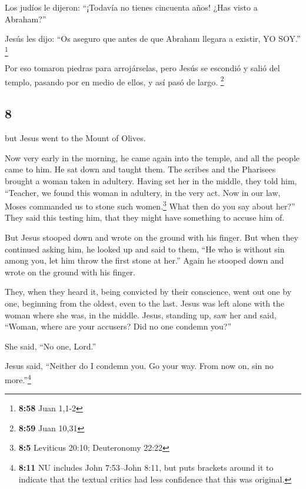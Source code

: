\begin{paracol}{2}
 Los judíos le dijeron: ``¡Todavía no tienes cincuenta
años! ¿Has visto a Abraham?''

 Jesús les dijo: ``Os aseguro que antes de que Abraham
llegara a existir, YO SOY.'' \footnote{\textbf{8:58} Juan 1,1-2}

 Por eso tomaron piedras para arrojárselas, pero Jesús se
escondió y salió del templo, pasando por en medio de ellos, y así pasó
de largo. \footnote{\textbf{8:59} Juan 10,31}

\switchcolumn
\begin{otherlanguage}{english}

\hypertarget{section-15}{%
\section{8}\label{section-15}}

 but Jesus went to the Mount of Olives.

 Now very early in the morning, he came again into the
temple, and all the people came to him. He sat down and taught them.
 The scribes and the Pharisees brought a woman taken in
adultery. Having set her in the middle,  they told him,
``Teacher, we found this woman in adultery, in the very act.
 Now in our law, Moses commanded us to stone such
women.\footnote{\textbf{8:5} Leviticus 20:10; Deuteronomy 22:22} What
then do you say about her?''  They said this testing him,
that they might have something to accuse him of.

But Jesus stooped down and wrote on the ground with his finger.
 But when they continued asking him, he looked up and said
to them, ``He who is without sin among you, let him throw the first
stone at her.''  Again he stooped down and wrote on the
ground with his finger.

 They, when they heard it, being convicted by their
conscience, went out one by one, beginning from the oldest, even to the
last. Jesus was left alone with the woman where she was, in the middle.
 Jesus, standing up, saw her and said, ``Woman, where are
your accusers? Did no one condemn you?''

 She said, ``No one, Lord.''

Jesus said, ``Neither do I condemn you. Go your way. From now on, sin no
more.''\footnote{\textbf{8:11} NU includes John 7:53--John 8:11, but
  puts brackets around it to indicate that the textual critics had less
  confidence that this was original.}


\end{otherlanguage}
\end{paracol}
